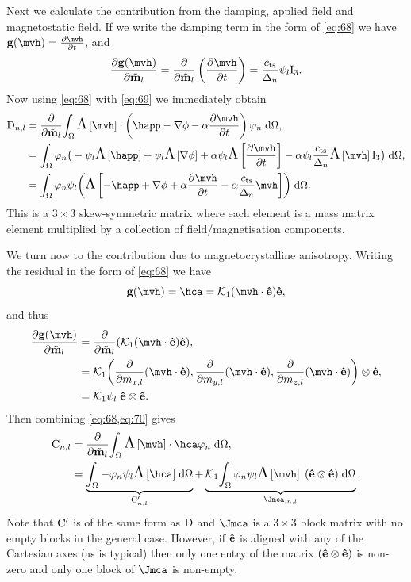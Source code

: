 Next we calculate the contribution from the damping, applied field and magnetostatic field.
If we write the damping term in the form of \cref{eq:68} we have $\gv(\mvh) = \dmdth$, and
\begin{equation}
  \label{eq:69}
  \pd{\gv(\mvh)}{\mvdis_l} = \pd{}{\mvdis_l} \left(\pd{\mvh}{t} \right) = \jts \sbf_l \Idm_3.
\end{equation}
Now using \cref{eq:68} with \cref{eq:69} we immediately obtain
\begin{equation}
  \begin{aligned}
    \Dm_{n,l} &= \pd{}{\mvdis_l} \intd{  \skewm{\mvh} \cdot
      \left( \happ - \grad \phim - \dampc \dmdth
      \right) \tbf_n}, \\
    &= \int_\magd \tbf_n \big( -\sbf_l\skewm{\happ} + \sbf_l\skewm{\grad \phi} + \dampc\sbf_l \skewm{\dmdth} - \dampc\sbf_l \jts \skewm{\mvh} \Idm_3
    \big) \d\magd, \\
    &= \intd{ \tbf_n \sbf_l \bigb{ \skewm{-\happ + \grad \phi
          + \dampc \dmdth - \dampc \jts \mvh}}}.
    \label{eq:field-damping-jacobian}
  \end{aligned}
\end{equation}
This is a $3\times3$ skew-symmetric matrix where each element is a mass matrix element multiplied by a collection of field/magnetisation components.

We turn now to the contribution due to magnetocrystalline anisotropy.
Writing the residual in the form of \cref{eq:68} we have
\begin{equation}
  \gv(\mvh) = \hca = \kone (\mvh \cdot \ev) \ev,
\end{equation}
and thus
\begin{equation}
  \begin{aligned}
    \pd{\gv(\mvh)}{\mvdis_l} &= \pd{}{\mvdis_l} \bigb{ \kone (\mvh \cdot \ev) \ev}, \\
    &= \kone \bigb{ \pd{}{m_{x,l}} (\mvh \cdot \ev),
      \pd{}{m_{y,l}} (\mvh \cdot \ev),
      \pd{}{m_{z,l}} (\mvh \cdot \ev) }  \tensorprod \ev, \\
    &= \kone \sbf_l \; \ev  \tensorprod \ev.
    \label{eq:70}
  \end{aligned}
\end{equation}
Then combining \cref{eq:68,eq:70} gives
\begin{equation}
  \begin{aligned}
    \Cm_{n,l} &= \pd{}{\mvdis_l} \intd{ \skewm{\mvh} \cdot \hca  \tbf_n}, \\
    &= \underbrace{\intd{ -\tbf_n \sbf_l\skewm{\hca} }}_{\Cm'_{n,l}}
    + \underbrace{\kone \intd{ \tbf_n \sbf_l \skewm{\mvh} \; (\ev  \tensorprod \ev) }}_{\Jmca_{,n,l}}.
    \label{eq:hca-jacobian}
  \end{aligned}
\end{equation}
Note that $\mathrm{C}'$ is of the same form as $\mathrm{D}$ and $\Jmca$ is a $3\times3$ block matrix with no empty blocks in the general case.
However, if $\boldsymbol{\mathrm{\hat{e}}}$ is aligned with any of the Cartesian axes (as is typical) then only one entry of the matrix $(\boldsymbol{\mathrm{\hat{e}}} \otimes \boldsymbol{\mathrm{\hat{e}}})$ is non-zero and only one block of $\Jmca$ is non-empty.

